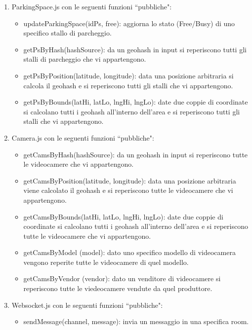 \begin{enumerate}
	\item ParkingSpace.js con le seguenti funzioni ``pubbliche":
	\begin{itemize}
			\item updateParkingSpace(idPs, free): aggiorna lo stato (Free/Busy) di uno specifico stallo di parcheggio.
			\item getPsByHash(hashSource): da un geohash in input si reperiscono tutti gli stalli di parcheggio che vi appartengono.
			\item getPsByPosition(latitude, longitude): data una posizione arbitraria si calcola il geohash e si reperiscono tutti gli stalli che vi appartengono.
			\item getPsByBounds(latHi, latLo, lngHi, lngLo): date due coppie di coordinate si calcolano tutti i geohash all'interno dell'area e si reperiscono tutti gli stalli che vi appartengono.
		\end{itemize}

	\item Camera.js con le seguenti funzioni ``pubbliche":
	\begin{itemize}
			\item getCamsByHash(hashSource): da un geohash in input si reperiscono tutte le videocamere che vi appartengono.
			\item getCamsByPosition(latitude, longitude): data una posizione arbitraria viene calcolato il geohash e si reperiscono tutte le videocamere che vi appartengono.
			\item getCamsByBounds(latHi, latLo, lngHi, lngLo): date due coppie di coordinate si calcolano tutti i geohash all'interno dell'area e si reperiscono tutte le videocamere che vi appartengono.
			\item getCamsByModel (model): dato uno specifico modello di videocamera vengono reperite tutte le videocamere di quel modello.
			\item getCamsByVendor (vendor): dato un venditore di videocamere si reperiscono tutte le viedeocamere vendute da quel produttore.
	\end{itemize}

	\item Websocket.js con le seguenti funzioni ``pubbliche":
	\begin{itemize}
		\item sendMessage(channel, message): invia un messaggio in una specifica room.
	\end{itemize}
\end{enumerate}

